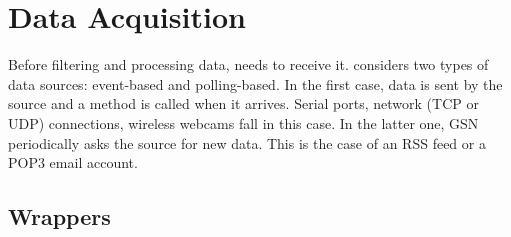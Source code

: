 

\section{Data Acquisition}

Before filtering and processing data, \gsn needs to receive it. \gsn considers two types of data sources: event-based and polling-based.
In the first case, data is sent by the source and a \gsn method is called when it arrives.
Serial ports, network (TCP or UDP) connections, wireless webcams fall in this case. In the latter one, GSN periodically asks the 
source for new data. This is the case of an RSS feed or a POP3 email account.

\subsection{\gsn Wrappers \label{gsn_wrappers}}


